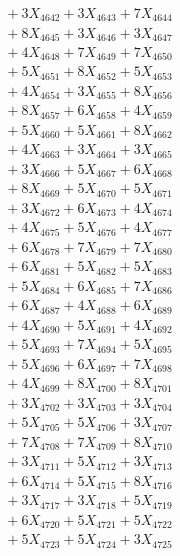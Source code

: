 \documentclass[a4paper,10pt]{article}
\begin{document}
{\begin{align}
&\;  + 3 X_{4642} + 3 X_{4643} + 7 X_{4644} \\[0.3ex]
&\;  + 8 X_{4645} + 3 X_{4646} + 3 X_{4647} \\[0.3ex]
&\;  + 4 X_{4648} + 7 X_{4649} + 7 X_{4650} \\[0.3ex]
&\;  + 5 X_{4651} + 8 X_{4652} + 5 X_{4653} \\[0.3ex]
&\;  + 4 X_{4654} + 3 X_{4655} + 8 X_{4656} \\[0.3ex]
&\;  + 8 X_{4657} + 6 X_{4658} + 4 X_{4659} \\[0.5ex]\allowbreak
&\;  + 5 X_{4660} + 5 X_{4661} + 8 X_{4662} \\[0.3ex]
&\;  + 4 X_{4663} + 3 X_{4664} + 3 X_{4665} \\[0.3ex]
&\;  + 3 X_{4666} + 5 X_{4667} + 6 X_{4668} \\[0.3ex]
&\;  + 8 X_{4669} + 5 X_{4670} + 5 X_{4671} \\[0.3ex]
&\;  + 3 X_{4672} + 6 X_{4673} + 4 X_{4674} \\[0.3ex]
&\;  + 4 X_{4675} + 5 X_{4676} + 4 X_{4677} \\[0.3ex]
&\;  + 6 X_{4678} + 7 X_{4679} + 7 X_{4680} \\[0.3ex]
&\;  + 6 X_{4681} + 5 X_{4682} + 5 X_{4683} \\[0.3ex]
&\;  + 5 X_{4684} + 6 X_{4685} + 7 X_{4686} \\[0.3ex]
&\;  + 6 X_{4687} + 4 X_{4688} + 6 X_{4689} \\[0.5ex]\allowbreak
&\;  + 4 X_{4690} + 5 X_{4691} + 4 X_{4692} \\[0.3ex]
&\;  + 5 X_{4693} + 7 X_{4694} + 5 X_{4695} \\[0.3ex]
&\;  + 5 X_{4696} + 6 X_{4697} + 7 X_{4698} \\[0.3ex]
&\;  + 4 X_{4699} + 8 X_{4700} + 8 X_{4701} \\[0.3ex]
&\;  + 3 X_{4702} + 3 X_{4703} + 3 X_{4704} \\[0.3ex]
&\;  + 5 X_{4705} + 5 X_{4706} + 3 X_{4707} \\[0.3ex]
&\;  + 7 X_{4708} + 7 X_{4709} + 8 X_{4710} \\[0.3ex]
&\;  + 3 X_{4711} + 5 X_{4712} + 3 X_{4713} \\[0.3ex]
&\;  + 6 X_{4714} + 5 X_{4715} + 8 X_{4716} \\[0.3ex]
&\;  + 3 X_{4717} + 3 X_{4718} + 5 X_{4719} \\[0.5ex]\allowbreak
&\;  + 6 X_{4720} + 5 X_{4721} + 5 X_{4722} \\[0.3ex]
&\;  + 5 X_{4723} + 5 X_{4724} + 3 X_{4725} \\[0.3ex]

\end{align}}
\end{document}
